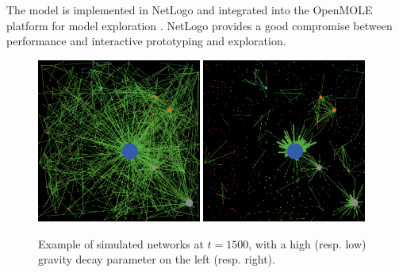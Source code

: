 \documentclass{article}
\begin{document}


The model is implemented in NetLogo and integrated into the OpenMOLE platform for model exploration \cite{reuillon2013openmole}. NetLogo provides a good compromise between performance and interactive prototyping and exploration.



\begin{figure}
    \includegraphics[width=0.48\textwidth]{figures/ex_alleq-highgravity_seed-12102_t1500.png}\hspace{0.1cm}
    \includegraphics[width=0.48\textwidth]{figures/ex_alleq-lowgravity_seed-12102_t1500.png}	
    \caption{Example of simulated networks at $t=1500$, with a high (resp. low) gravity decay parameter on the left (resp. right).\label{fig:example}}
\end{figure}
\end{document}
